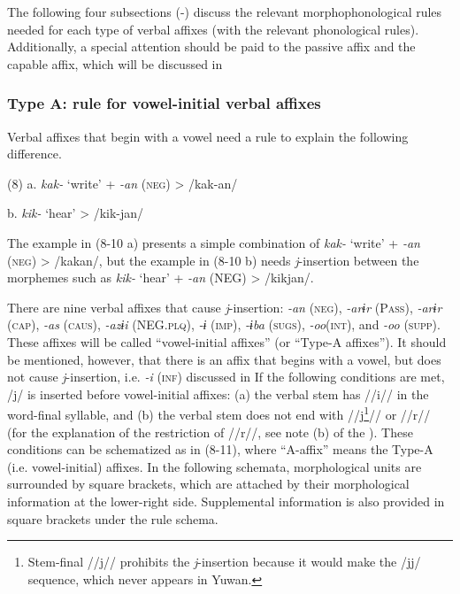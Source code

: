 The following four subsections (-) discuss the relevant morphophonological rules needed for each type of verbal affixes (with the relevant phonological rules). Additionally, a special attention should be paid to the passive affix and the capable affix, which will be discussed in 

\subsubsection{Type A: rule for vowel-initial verbal affixes}

Verbal affixes that begin with a vowel need a rule to explain the following difference.

(8)  a.  \textit{kak-}  ‘write’  +  \textit{{}-an} (\textsc{neg})  >  /kak-an/

  b.  \textit{kik-}  ‘hear’        >  /kik-jan/

The example in (8-10 a) presents a simple combination of \textit{kak-} ‘write’ + \textit{{}-an} (\textsc{neg}) > /kakan/, but the example in (8-10 b) needs \textit{j}{}-insertion between the morphemes such as \textit{kik-} ‘hear’ + \textit{{}-an} (NEG) > /kikjan/.

There are nine verbal affixes that cause \textit{j}{}-insertion: \textit{{}-an} (\textsc{neg}), \textit{{}-arɨr} (P\textsc{ass}), \textit{{}-arɨr} (\textsc{cap}), \textit{{}-as} (\textsc{caus}), \textit{{}-azɨi} (NEG.\textsc{plq}), \textit{{}-ɨ} (\textsc{imp}), \textit{{}-ɨba} (\textsc{sugs}), \textit{{}-oo}(\textsc{int}), and \textit{{}-oo} (\textsc{supp}). These affixes will be called “vowel-initial affixes” (or “Type-A affixes”). It should be mentioned, however, that there is an affix that begins with a vowel, but does not cause \textit{j}{}-insertion, i.e. \textit{{}-i} (\textsc{inf}) discussed in  If the following conditions are met, /j/ is inserted before vowel-initial affixes: (a) the verbal stem has //i// in the word-final syllable, and (b) the verbal stem does not end with //j\footnote{Stem-final //j// prohibits the \textit{j}{}-insertion because it would make the /jj/ sequence, which never appears in Yuwan.}// or //r// (for the explanation of the restriction of //r//, see note (b) of the ). These conditions can be schematized as in (8-11), where “A-affix” means the Type-A (i.e. vowel-initial) affixes. In the following schemata, morphological units are surrounded by square brackets, which are attached by their morphological information at the lower-right side. Supplemental information is also provided in square brackets under the rule schema.

